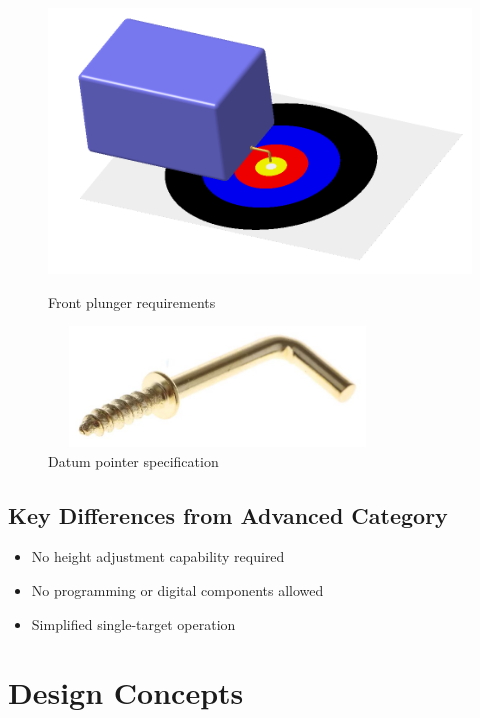 \documentclass{article}
\begin{document}
\begin{figure}[h]
	\centering
	\begin{minipage}{0.45\textwidth}
		\centering
		\includegraphics[width=0.8\linewidth]{extracted_images/image_10_2.png}
		\caption{Front plunger requirements}
	\end{minipage}
	\begin{minipage}{0.45\textwidth}
		\centering
		\includegraphics[width=0.8\textwidth,height=3.2cm]{extracted_images/image_10_1.png}
		\caption{Datum pointer specification}
	\end{minipage}
\end{figure}
\subsection*{Key Differences from Advanced Category}
\begin{itemize}[itemsep=-0.7mm]
	\item No height adjustment capability required
	\item No programming or digital components allowed
	\item Simplified single-target operation
\end{itemize}


\newpage{}
\section{Design Concepts}
\end{document}
